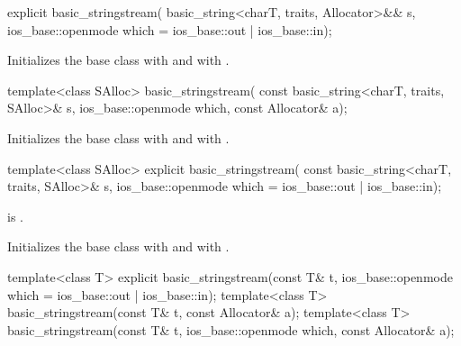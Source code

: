 %
\begin{itemdecl}
explicit basic_stringstream(
  basic_string<charT, traits, Allocator>&& s,
  ios_base::openmode which = ios_base::out | ios_base::in);
\end{itemdecl}

\begin{itemdescr}
\pnum
\effects
Initializes the base class with
and  with
.
\end{itemdescr}

%
\begin{itemdecl}
template<class SAlloc>
  basic_stringstream(
    const basic_string<charT, traits, SAlloc>& s,
    ios_base::openmode which, const Allocator& a);
\end{itemdecl}

\begin{itemdescr}
\pnum
\effects
Initializes the base class with
and  with
.
\end{itemdescr}

%
\begin{itemdecl}
template<class SAlloc>
  explicit basic_stringstream(
    const basic_string<charT, traits, SAlloc>& s,
    ios_base::openmode which = ios_base::out | ios_base::in);
\end{itemdecl}

\begin{itemdescr}
\pnum
\constraints
{} is .

\pnum
\effects
Initializes the base class with
and  with
.
\end{itemdescr}

%
\begin{itemdecl}
template<class T>
  explicit basic_stringstream(const T& t, ios_base::openmode which = ios_base::out | ios_base::in);
template<class T>
  basic_stringstream(const T& t, const Allocator& a);
template<class T>
  basic_stringstream(const T& t, ios_base::openmode which, const Allocator& a);
\end{itemdecl}

